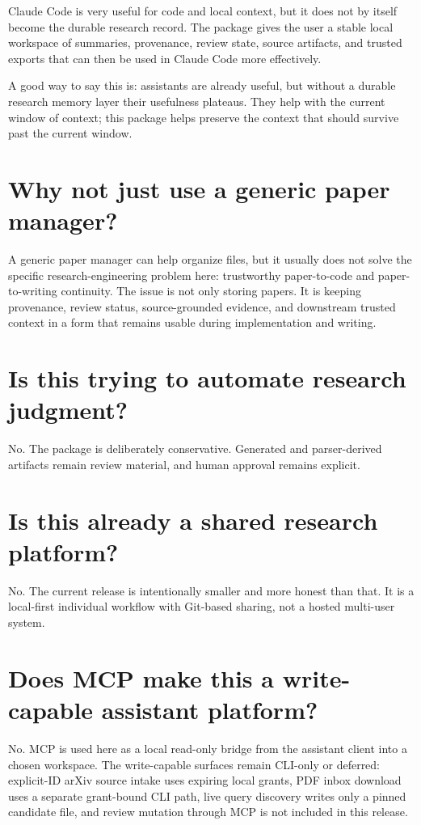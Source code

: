 \documentclass[11pt,a4paper,openany]{book}
\begin{document}
Claude Code is very useful for code and local context, but it does not by itself
become the durable research record. The package gives the user a stable local
workspace of summaries, provenance, review state, source artifacts, and trusted
exports that can then be used in Claude Code more effectively.

A good way to say this is: assistants are already useful, but without a durable
research memory layer their usefulness plateaus. They help with the current
window of context; this package helps preserve the context that should survive
past the current window.

\section{Why not just use a generic paper manager?}

A generic paper manager can help organize files, but it usually does not solve
the specific research-engineering problem here: trustworthy paper-to-code and
paper-to-writing continuity. The issue is not only storing papers. It is keeping
provenance, review status, source-grounded evidence, and downstream trusted
context in a form that remains usable during implementation and writing.

\section{Is this trying to automate research judgment?}

No. The package is deliberately conservative. Generated and parser-derived
artifacts remain review material, and human approval remains explicit.

\section{Is this already a shared research platform?}

No. The current release is intentionally smaller and more honest than that. It is
a local-first individual workflow with Git-based sharing, not a hosted
multi-user system.

\section{Does MCP make this a write-capable assistant platform?}

No. MCP is used here as a local read-only bridge from the assistant client into a
chosen workspace. The write-capable surfaces remain CLI-only or deferred:
explicit-ID arXiv source intake uses expiring local grants, PDF inbox download
uses a separate grant-bound CLI path, live query discovery writes only a pinned
candidate file, and review mutation through MCP is not included in this release.
\end{document}
